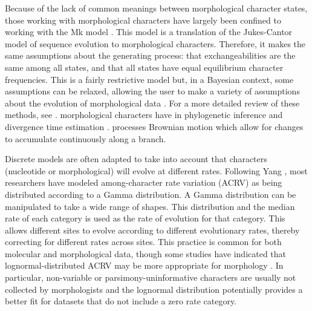 Because of the lack of common meanings between morphological character states, those working with morphological characters have largely been confined to working with the Mk model \citep{Lewis2001} .
This model is a translation of the Jukes-Cantor model \citep{Jukes1969} of sequence evolution to morphological characters.
Therefore, it makes the same assumptions about the generating process: that exchangeabilities are the same among all  states, and that all states have equal equilibrium character frequencies.
This is a fairly restrictive model but, in a Bayesian context, some assumptions can be relaxed, allowing the user to make a variety of assumptions about the evolution of morphological data \citep{Nylander2004, Wright2016}.
For a more detailed review of these methods, see \citep{Wright2019}.
 morphological characters have  in phylogenetic inference \citep{goloboff2006, parins2017} and divergence time estimation \citep{AlvarezC2019}.
 processes  Brownian motion  which allow for changes to accumulate continuously along a branch.

Discrete models are often adapted to take into account that characters (nucleotide or morphological) will evolve at different rates. Following Yang \citep{Yang1994a},
most researchers have modeled among-character rate variation (ACRV) as being distributed according to a Gamma distribution.
A Gamma distribution can be manipulated to take a wide range of shapes.
This distribution 
and the median rate of each category is used as the rate of evolution for that category.
This allows different sites to evolve according to different evolutionary rates, thereby correcting for different rates across sites.
This practice is common for both molecular and morphological data, though some studies have indicated that lognormal-distributed ACRV may be more appropriate for morphology \citep{wagner2011, Harrison2015}.
In particular, non-variable or parsimony-uninformative characters are usually not collected by morphologists and the lognormal distribution potentially provides a better fit for datasets that do not include a zero rate category.

